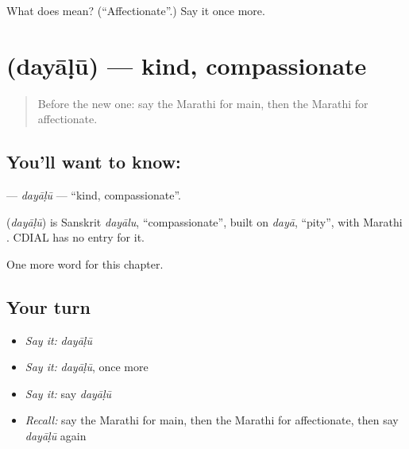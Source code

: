\begin{tcolorbox}[breakable,colback=teal!4,colframe=teal!35!black,title={Before you move on}]
What does  mean? (\textquotedblleft{}Affectionate\textquotedblright{}.) Say it once more.
\end{tcolorbox}
\section[\texorpdfstring{\mr{दयाळू} (dayāḷū)}{दयाळू (dayāḷū)}]{ (dayāḷū) — kind, compassionate}

\label{lesson:MR-C177-dayalu}



\begin{quote}
Before the new one: say the Marathi for main, then the Marathi for affectionate.
\end{quote}

\subsection*{You'll want to know: }
\textbf{} — \emph{dayāḷū} — \textquotedblleft{}kind, compassionate\textquotedblright{}.

\begin{cousinweb}
\textbf{} (\emph{dayāḷū}) is Sanskrit \emph{dayālu}, \textquotedblleft{}compassionate\textquotedblright{}, built on \emph{dayā}, \textquotedblleft{}pity\textquotedblright{}, with Marathi \textbf{}. CDIAL has no entry for it.
\end{cousinweb}

\begin{grammarlens}[title={What you've built}]
One more word for this chapter.
\end{grammarlens}

\subsection*{Your turn}
\begin{itemize}
\raggedright
  \item \emph{Say it:} \emph{dayāḷū}
  \item \emph{Say it:} \emph{dayāḷū}, once more
  \item \emph{Say it:} say \emph{dayāḷū}
  \item \emph{Recall:} say the Marathi for main, then the Marathi for affectionate, then say \emph{dayāḷū} again
\end{itemize}

